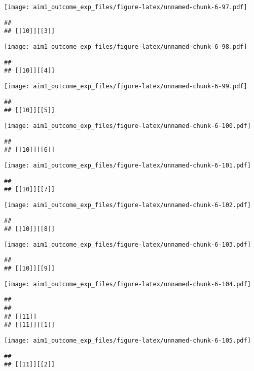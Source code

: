 \documentclass[
]{article}
\begin{document}
\texttt{[image: aim1\_outcome\_exp\_files/figure-latex/unnamed-chunk-6-97.pdf]}

\begin{verbatim}
## 
## [[10]][[3]]
\end{verbatim}

\texttt{[image: aim1\_outcome\_exp\_files/figure-latex/unnamed-chunk-6-98.pdf]}

\begin{verbatim}
## 
## [[10]][[4]]
\end{verbatim}

\texttt{[image: aim1\_outcome\_exp\_files/figure-latex/unnamed-chunk-6-99.pdf]}

\begin{verbatim}
## 
## [[10]][[5]]
\end{verbatim}

\texttt{[image: aim1\_outcome\_exp\_files/figure-latex/unnamed-chunk-6-100.pdf]}

\begin{verbatim}
## 
## [[10]][[6]]
\end{verbatim}

\texttt{[image: aim1\_outcome\_exp\_files/figure-latex/unnamed-chunk-6-101.pdf]}

\begin{verbatim}
## 
## [[10]][[7]]
\end{verbatim}

\texttt{[image: aim1\_outcome\_exp\_files/figure-latex/unnamed-chunk-6-102.pdf]}

\begin{verbatim}
## 
## [[10]][[8]]
\end{verbatim}

\texttt{[image: aim1\_outcome\_exp\_files/figure-latex/unnamed-chunk-6-103.pdf]}

\begin{verbatim}
## 
## [[10]][[9]]
\end{verbatim}

\texttt{[image: aim1\_outcome\_exp\_files/figure-latex/unnamed-chunk-6-104.pdf]}

\begin{verbatim}
## 
## 
## [[11]]
## [[11]][[1]]
\end{verbatim}

\texttt{[image: aim1\_outcome\_exp\_files/figure-latex/unnamed-chunk-6-105.pdf]}

\begin{verbatim}
## 
## [[11]][[2]]
\end{verbatim}
\end{document}
